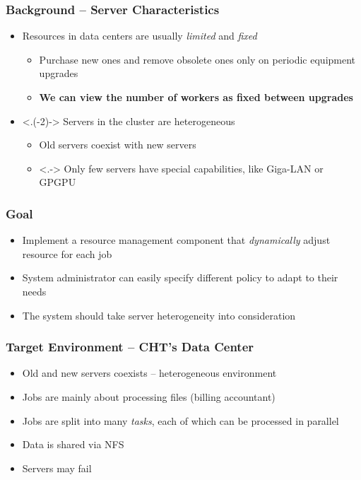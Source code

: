 \documentclass{beamer}
\begin{document}
\begin{frame}
  \frametitle{Background -- Server Characteristics}
  \begin{itemize}[<+->]
    \item Resources in data centers are usually \emph{limited} and
      \emph{fixed}
      \begin{itemize}
        \item Purchase new ones and remove obsolete ones only on
          periodic equipment upgrades
        \item \textbf{We can view the number of workers as fixed between
          upgrades}
      \end{itemize}
    \item <.(-2)-> Servers in the cluster are \alert{heterogeneous}
      \begin{itemize}
        \item Old servers coexist with new servers
        \item <.-> Only few servers have special capabilities, like Giga-LAN
          or GPGPU
      \end{itemize}
  \end{itemize}
\end{frame}
\begin{frame}
  \frametitle{Goal}
  \begin{itemize}
    \item Implement a resource management component that \emph{dynamically}
      adjust resource for each job
    \item System administrator can easily specify different policy to
      adapt to their needs
    \item The system should take server heterogeneity into consideration
  \end{itemize}
\end{frame}
\begin{frame}
  \frametitle{Target Environment -- CHT's Data Center}
  \begin{itemize}
    \item Old and new servers coexists -- heterogeneous environment
    \item Jobs are mainly about processing files (billing accountant)
    \item Jobs are split into many \emph{tasks}, each of which can be processed
      in parallel
    \item Data is shared via NFS
    \item Servers may fail
  \end{itemize}
\end{frame}
\end{document}
